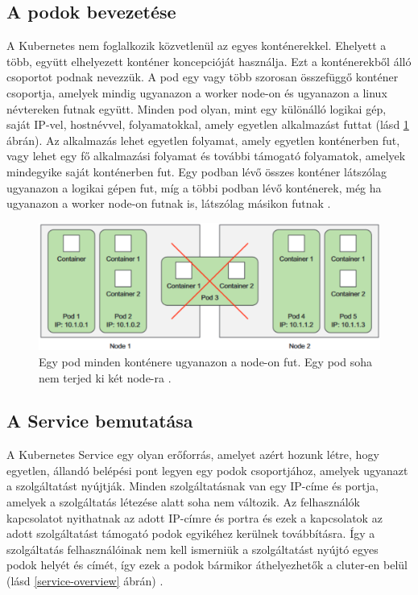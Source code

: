 \subsection{A podok bevezetése}
A Kubernetes nem foglalkozik közvetlenül az egyes konténerekkel.
Ehelyett a több, együtt elhelyezett konténer koncepcióját használja.
Ezt a konténerekből álló csoportot podnak nevezzük.
A pod egy vagy több szorosan összefüggő konténer csoportja, amelyek mindig ugyanazon a worker node-on és ugyanazon a linux névtereken futnak együtt.
Minden pod olyan, mint egy különálló logikai gép, saját IP-vel, hostnévvel, folyamatokkal, amely egyetlen alkalmazást futtat (lásd \ref{node-pod-scheduler} ábrán).
Az alkalmazás lehet egyetlen folyamat, amely egyetlen konténerben fut, vagy lehet egy fő alkalmazási folyamat és további támogató folyamatok, amelyek mindegyike saját konténerben fut.
Egy podban lévő összes konténer látszólag ugyanazon a logikai gépen fut, míg a többi podban lévő konténerek, még ha ugyanazon a worker node-on futnak is, látszólag másikon futnak \cite{Marko17}.

\begin{figure}[ht]
    \centering
         \includegraphics[width=1.0\textwidth]{figures/kubernetes/node-pod-scheduler.png}
          \caption{Egy pod minden konténere ugyanazon a node-on fut. Egy pod soha nem terjed ki két node-ra \cite{Marko17}.}
           \label{node-pod-scheduler}
\end{figure}

\subsection{A Service bemutatása}
A Kubernetes Service egy olyan erőforrás, amelyet azért hozunk létre, hogy egyetlen, állandó belépési pont legyen egy podok csoportjához, amelyek ugyanazt a szolgáltatást nyújtják.
Minden szolgáltatásnak van egy IP-címe és portja, amelyek a szolgáltatás létezése alatt soha nem változik.
Az felhasználók kapcsolatot nyithatnak az adott IP-címre és portra és ezek a kapcsolatok az adott szolgáltatást támogató podok egyikéhez kerülnek továbbításra.
Így a szolgáltatás felhasználóinak nem kell ismerniük a szolgáltatást nyújtó egyes podok helyét és címét, így ezek a podok bármikor áthelyezhetők a cluter-en belül (lásd \ref{service-overview} ábrán) \cite{Marko17}.

